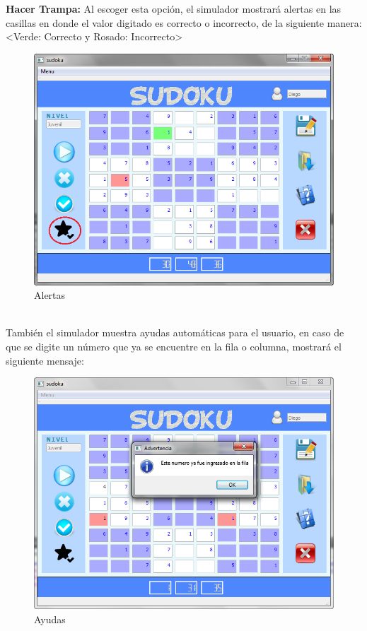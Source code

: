 \ \\ \ \\ \ \\ \ \\ \ \\ \ \\ \ \\
\textbf{Hacer Trampa:} Al escoger esta opción, el simulador mostrará alertas en las casillas en donde el valor digitado es correcto o incorrecto, de la siguiente manera: \\ <Verde: Correcto y Rosado: Incorrecto>


\begin{figure}[htbp]
\begin{center}
\includegraphics[width=.50\textwidth]{./imagenes/HacerTrampa.png}
\caption{Alertas}
\label{Alertas}
\end{center}
\end{figure} 

\ \\ También el simulador muestra ayudas automáticas para el usuario, en caso de que se digite un número que ya se encuentre en la fila o columna, mostrará el siguiente mensaje:

\begin{figure}[htbp]
\begin{center}
\includegraphics[width=.50\textwidth]{./imagenes/Pistas1.png}
\caption{Ayudas}
\label{Ayudas}
\end{center}
\end{figure} 

